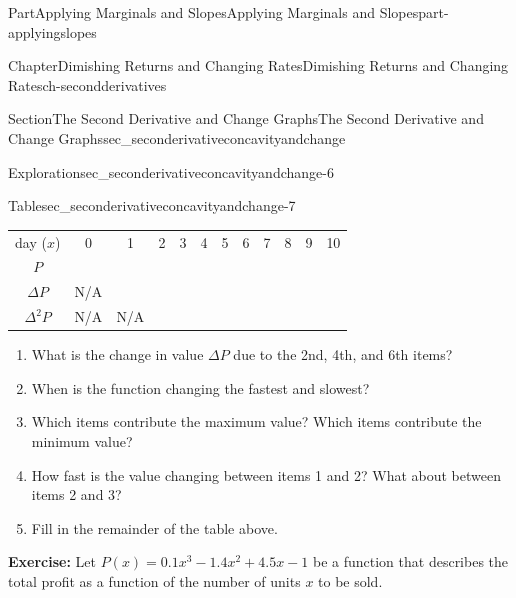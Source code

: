 \documentclass[oneside,10pt,]{tufte-book}
\newcommand{\tabularfont}{\relax}
\newcommand{\terminology}[1]{\textbf{#1}}
\numberwithin{equation}{chapter}
\begin{document}
\begin{partptx}{Part}{Applying Marginals and Slopes}{}{Applying Marginals and Slopes}{}{}{part-applyingslopes}
\begin{chapterptx}{Chapter}{Dimishing Returns and Changing Rates}{}{Dimishing Returns and Changing Rates}{}{}{ch-secondderivatives}
\begin{sectionptx}{Section}{The Second Derivative and Change Graphs}{}{The Second Derivative and Change Graphs}{}{}{sec_seconderivativeconcavityandchange}
\begin{exploration}{Exploration}{}{sec_seconderivativeconcavityandchange-6}
\begin{image}{0}{1}{0}{}
{\begin{tikzpicture}[xscale=\xscale,yscale=\yscale]
	
\end{tikzpicture}
}%
\end{image}%
%
\end{exploration}%
\begin{tableptx}{Table}{\textbf{}}{sec_seconderivativeconcavityandchange-7}{}%
\centering%
{\tabularfont%
\begin{tabular}{llllllllllll}
\multicolumn{1}{c}{day (\(x\))}&\multicolumn{1}{c}{0}&\multicolumn{1}{c}{1}&\multicolumn{1}{c}{2}&\multicolumn{1}{c}{3}&\multicolumn{1}{c}{4}&\multicolumn{1}{c}{5}&\multicolumn{1}{c}{6}&\multicolumn{1}{c}{7}&\multicolumn{1}{c}{8}&\multicolumn{1}{c}{9}&\multicolumn{1}{c}{10}\tabularnewline[0pt]
\multicolumn{1}{c}{\(P\)}&\multicolumn{1}{c}{}&\multicolumn{1}{c}{}&\multicolumn{1}{c}{}&\multicolumn{1}{c}{}&\multicolumn{1}{c}{}&\multicolumn{1}{c}{}&\multicolumn{1}{c}{}&\multicolumn{1}{c}{}&\multicolumn{1}{c}{}&\multicolumn{1}{c}{}&\multicolumn{1}{c}{}\tabularnewline[0pt]
\multicolumn{1}{c}{\(\Delta P\)}&\multicolumn{1}{c}{N\slash{}A}&\multicolumn{1}{c}{}&\multicolumn{1}{c}{}&\multicolumn{1}{c}{}&\multicolumn{1}{c}{}&\multicolumn{1}{c}{}&\multicolumn{1}{c}{}&\multicolumn{1}{c}{}&\multicolumn{1}{c}{}&\multicolumn{1}{c}{}&\multicolumn{1}{c}{}\tabularnewline[0pt]
\multicolumn{1}{c}{\(\Delta^2 P\)}&\multicolumn{1}{c}{N\slash{}A}&\multicolumn{1}{c}{N\slash{}A}&\multicolumn{1}{c}{}&\multicolumn{1}{c}{}&\multicolumn{1}{c}{}&\multicolumn{1}{c}{}&\multicolumn{1}{c}{}&\multicolumn{1}{c}{}&\multicolumn{1}{c}{}&\multicolumn{1}{c}{}&\multicolumn{1}{c}{}
\end{tabular}
}%
\end{tableptx}%
%
\begin{enumerate}
\item{}What is the change in value \(\Delta P\) due to the 2nd, 4th, and 6th items?%
\item{}When is the function changing the fastest and slowest?%
\item{}Which items contribute the maximum value? Which items contribute the minimum value?%
\item{}How fast is the value changing between items 1 and 2? What about between items 2 and 3?%
\item{}Fill in the remainder of the table above.%
\end{enumerate}
%
\par
\terminology{Exercise:} Let \(P(x) = 0.1x^3 -1.4x^2 + 4.5x - 1\) be a function that describes the total profit as a function of the number of units \(x\) to be sold.%
\begin{image}{0}{1}{0}{}%

\end{image}
\end{sectionptx}
\end{chapterptx}
\end{partptx}
\end{document}
